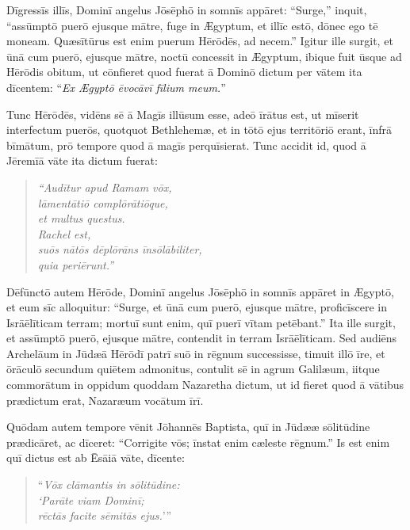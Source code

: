 \Versus Dīgressīs illīs, Dominī angelus Jōsēphō in somnīs appāret: ``Surge,'' inquit, ``assūm\-ptō puerō ejusque mātre, fuge in Ægyptum, et illīc estō, dōnec ego tē moneam. Quæsī\-tūrus est enim puerum Hērōdēs, ad necem.'' 
\Versus Igitur ille surgit, et ūnā cum puerō, ejusque mātre, noctū concessit in Ægyptum, 
\Versus ibique fuit ūsque ad Hērōdis obitum, ut cōnfieret quod fuerat ā Dominō dictum per vātem ita dīcentem: ``\emph{Ex Ægyptō ēvocāvī fīlium meum.}''

\Versus Tunc Hērōdēs, vidēns sē ā Magīs illūsum esse, adeō īrātus est, ut mīserit interfectum puerōs, quotquot Bethlehemæ, et in tōtō ejus territōriō erant, īnfrā bīmātum, prō tempore quod ā magīs perquīsierat. 
\Versus Tunc accidit id, quod ā Jēremīā vāte ita dictum fuerat: 

\begin{verse}
\begin{patverse*}
\Versus \emph{``Audītur apud Ramam vōx,\\
lāmentātiō complōrātiōque,\\
et multus questus.\\
Rachel est,\\
suōs nātōs dēplōrāns īnsōlābiliter,\\
quia periērunt.''}
\end{patverse*}
\end{verse}

\Versus Dēfūnctō autem Hērōde, Dominī angelus Jōsēphō in somnīs appāret in Ægyptō, 
\Versus et eum sīc alloquitur: ``Surge, et ūnā cum puerō, ejusque mātre, proficīscere in Isrāēlīticam terram; mortuī sunt enim, quī puerī vītam petēbant.'' 
\Versus Ita ille surgit, et assūmptō puerō, ejusque mātre, contendit in terram Isrāēlīticam. 
\Versus Sed audiēns Archelāum in Jūdæā Hērōdī patrī suō in rēgnum successisse, timuit illō īre, et ōrāculō secundum quiētem admonitus, contulit sē in agrum Galilæum, 
\Versus iitque commorātum in oppidum quoddam Nazaretha dictum, ut id fieret quod ā vātibus prædictum erat, Nazaræum vocātum īrī.
 

\Caput
\Versus Quōdam autem tempore vēnit Jōhannēs Baptista, quī in Jūdææ sōlitūdine prædicāret,
\Versus ac dīceret: ``Corrigite vōs; īnstat enim cæleste rēgnum.''
\Versus Is est enim quī dictus est ab Ēsāiā vāte, dīcente:
\begin{verse}
\begin{patverse*}
``\emph{Vōx clāmantis in sōlitūdine:\\
`Parāte viam Dominī;\\
rēctās facite sēmitās ejus.}'{}''
\end{patverse*}
\end{verse}

